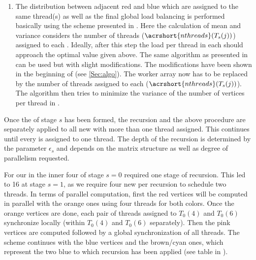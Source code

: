 \begin{enumerate}
	\item The distribution between adjacent red and blue \levelGroups which are assigned to the same thread(s) as well as the final global load balancing is performed basically using the scheme presented in . 
	Here the calculation of mean and variance considers the number of threads ($\acrshort{nthreads}(T_{s}(j))$) assigned to each \levelGroup . Ideally, after this step the load per thread in each \levelGroup should approach the optimal value given above.
	The same algorithm %
	as presented in  can be used but with slight modifications. 
	The modifications have been shown in the beginning of  (see \cref{Sec:algo}). 
	The worker array now has to be replaced by the number of threads assigned to each \levelGroup ($\acrshort{nthreads}(T_{s}(j))$). The algorithm then tries to minimize the variance of the number of vertices per thread in \levelGroups.
\end{enumerate}
Once the \levelGroup of stage $s$ has been formed, the recursion and the above procedure are separately applied to all new \levelGroups with more than one thread assigned. This continues until every \levelGroup is assigned to one thread. The depth of the recursion is determined by the parameter $\epsilon_s$ and depends on the matrix structure as well as degree of parallelism requested. 

For our \stex in   the inner four \levelGroups of stage $s=0$ required one stage of recursion. This led to 16 \levelGroups at stage $s=1$, as we require four new \levelGroups per recursion to schedule two threads. 
In terms of parallel computation, first the red vertices will be computed in parallel with the orange ones using four threads for both colors. Once the orange vertices are done, each pair of threads assigned to $T_0(4)$ and $T_0(6)$ synchronize locally (\ie within $T_0(4)$ and $T_0(6)$ separately). Then the pink vertices are computed followed by a global synchronization of all threads. The scheme continues with the blue vertices and the brown/cyan ones, which represent the two blue \levelGroups to which recursion has been applied (see table in ).  

